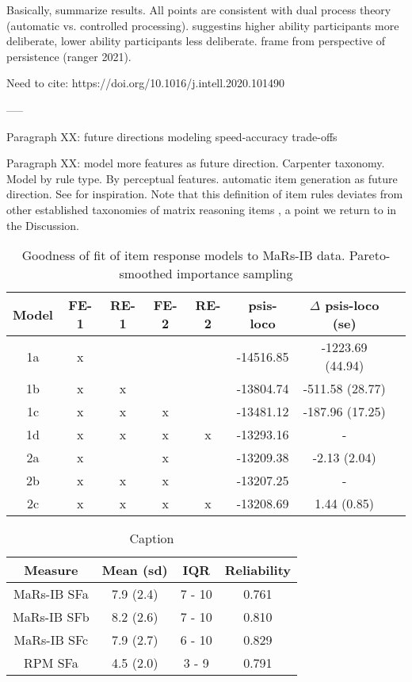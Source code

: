 \documentclass[a4paper,man,natbib]{apa6}
\begin{document}
Basically, summarize results. All points are consistent with dual process theory (automatic vs. controlled processing). suggestins higher ability participants more deliberate, lower ability participants less deliberate. frame from perspective of persistence (ranger 2021).

Need to cite: https://doi.org/10.1016/j.intell.2020.101490

-----

Paragraph XX: future directions modeling speed-accuracy trade-offs

Paragraph XX: model more features as future direction. Carpenter taxonomy. Model by rule type. By perceptual features. automatic item generation as future direction. See \cite{lathrop2017item} for inspiration. Note that this definition of item rules deviates from other established taxonomies of matrix reasoning items \citep{carpenter1990one}, a point we return to in the Discussion.



\begin{table}
    \centering
    \begin{tabular}{c|c|c|c|c|c|c|c}
    \hline
    Model & FE-1 & RE-1 & FE-2 & RE-2 & psis-loco & $\Delta$ psis-loco (se) \\
    \hline
    1a & x &   &   &   & -14516.85 & -1223.69 (44.94)\\
    1b & x & x &   &   & -13804.74 & -511.58 (28.77) \\
    1c & x & x & x &   & -13481.12 & -187.96 (17.25) \\
    1d & x & x & x & x & -13293.16 & - \\
    \hline
    2a & x &   & x &   & -13209.38 & -2.13 (2.04) \\
    2b & x & x & x &   & -13207.25 & - \\
    2c & x & x & x & x & -13208.69 & 1.44 (0.85) \\
    \hline
    \end{tabular}
    \caption{\label{tab:1} Goodness of fit of item response models to MaRs-IB data. Pareto-smoothed importance sampling}
    \label{table:1}
\end{table}

\begin{table}
    \centering
    \begin{tabular}{c|c|c|c}
    Measure & Mean (sd) & IQR & Reliability \\
    \hline
    MaRs-IB SFa & 7.9 (2.4) & 7 - 10 & 0.761 \\
    MaRs-IB SFb & 8.2 (2.6) & 7 - 10 & 0.810 \\
    MaRs-IB SFc & 7.9 (2.7) & 6 - 10 & 0.829 \\
    RPM SFa & 4.5 (2.0) & 3 - 9 & 0.791 \\
    \end{tabular}
    \caption{Caption}
    \label{table:2}
\end{table}
\end{document}
